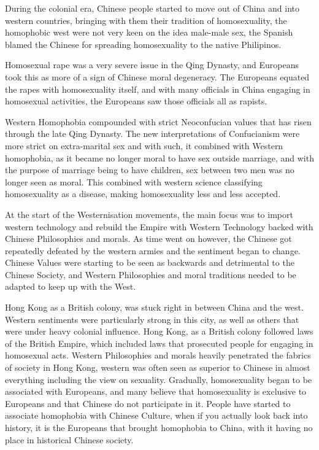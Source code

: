 During the colonial era, Chinese people started to move out of China and into western countries, bringing with them their tradition of homosexuality, the homophobic west were not very keen on the idea male-male sex, the Spanish blamed the Chinese for spreading homosexuality to the native Philipinos\autocite{10.2307/42632420}.

Homosexual rape was a very severe issue in the Qing Dynasty, and Europeans took this as more of a sign of Chinese moral degeneracy. The Europeans equated the rapes with homosexuality itself, and with many officials in China engaging in homosexual activities, the Europeans saw those officials all as rapists\Autocite{doi:10.1300/J236v07n01_08}.

Western Homophobia compounded with strict Neoconfucian values that has risen through the late Qing Dynasty. The new interpretations of Confucianism were more strict on extra-marital sex and with such, it combined with Western homophobia, as it became no longer moral to have sex outside marriage, and with the purpose of marriage being to have children, sex between two men was no longer seen as moral. This combined with western science classifying homosexuality as a disease, making homosexuality less and less accepted.

At the start of the Westernisation movements, the main focus was to import western technology and rebuild the Empire with Western Technology backed with Chinese Philosophies and morals. As time went on however, the Chinese got repeatedly defeated by the western armies and the sentiment began to change. Chinese Values were starting to be seen as backwards and detrimental to the Chinese Society, and Western Philosophies and moral traditions needed to be adapted to keep up with the West.

Hong Kong as a British colony, was stuck right in between China and the west. Western sentiments were particularly strong in this city, as well as others that were under heavy colonial influence. Hong Kong, as a British colony followed laws of the British Empire, which included laws that prosecuted people for engaging in homosexual acts. Western Philosophies and morals heavily penetrated the fabrics of society in Hong Kong, western was often seen as superior to Chinese in almost everything including the view on sexuality. Gradually, homosexuality began to be associated with Europeans, and many believe that homosexuality is exclusive to Europeans and that Chinese do not participate in it. People have started to associate homophobia with Chinese Culture, when if you actually look back into history, it is the Europeans that brought homophobia to China, with it having no place in historical Chinese society.

